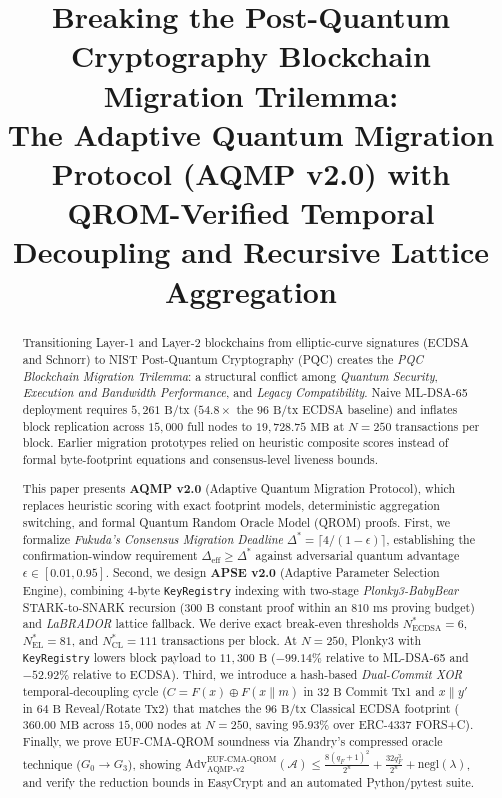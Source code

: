 \documentclass[conference,compsoc]{IEEEtran}
\title{Breaking the Post-Quantum Cryptography Blockchain Migration Trilemma:\\
The Adaptive Quantum Migration Protocol (AQMP v2.0) with QROM-Verified Temporal Decoupling and Recursive Lattice Aggregation}
\author{
  \IEEEauthorblockN{Laudza Kusuma}
  \IEEEauthorblockA{Independent Researcher, Depok, Indonesia\\
  Email: laudzaxie@gmail.com\\
  Web: \url{https://laudzakusuma.github.io}}
}
\begin{document}
\sloppy
\maketitle

\begin{abstract}
Transitioning Layer-1 and Layer-2 blockchains from elliptic-curve signatures (ECDSA and Schnorr) to NIST Post-Quantum Cryptography (PQC) creates the \emph{PQC Blockchain Migration Trilemma}: a structural conflict among \emph{Quantum Security}, \emph{Execution and Bandwidth Performance}, and \emph{Legacy Compatibility}. Naive ML-DSA-65 deployment requires $5{,}261\text{ B/tx}$ ($54.8\times$ the $96\text{ B/tx}$ ECDSA baseline) and inflates block replication across $15{,}000$ full nodes to $19{,}728.75\text{ MB}$ at $N = 250$ transactions per block. Earlier migration prototypes relied on heuristic composite scores instead of formal byte-footprint equations and consensus-level liveness bounds.

This paper presents \textbf{AQMP v2.0} (Adaptive Quantum Migration Protocol), which replaces heuristic scoring with exact footprint models, deterministic aggregation switching, and formal Quantum Random Oracle Model (QROM) proofs. First, we formalize \emph{Fukuda's Consensus Migration Deadline} $\Delta^* = \lceil 4/(1-\epsilon)\rceil$, establishing the confirmation-window requirement $\Delta_{\text{eff}} \ge \Delta^*$ against adversarial quantum advantage $\epsilon \in [0.01, 0.95]$. Second, we design \textbf{APSE v2.0} (Adaptive Parameter Selection Engine), combining 4-byte \texttt{KeyRegistry} indexing with two-stage \emph{Plonky3-BabyBear} STARK-to-SNARK recursion ($300\text{ B}$ constant proof within an $810\text{ ms}$ proving budget) and \emph{LaBRADOR} lattice fallback. We derive exact break-even thresholds $N^*_{\text{ECDSA}} = 6$, $N^*_{\text{EL}} = 81$, and $N^*_{\text{CL}} = 111$ transactions per block. At $N = 250$, Plonky3 with \texttt{KeyRegistry} lowers block payload to $11{,}300\text{ B}$ ($-99.14\%$ relative to ML-DSA-65 and $-52.92\%$ relative to ECDSA). Third, we introduce a hash-based \emph{Dual-Commit XOR} temporal-decoupling cycle ($C = F(x) \oplus F(x \parallel m)$ in $32\text{ B}$ Commit Tx1 and $x \parallel y'$ in $64\text{ B}$ Reveal/Rotate Tx2) that matches the $96\text{ B/tx}$ Classical ECDSA footprint ($360.00\text{ MB}$ across $15{,}000$ nodes at $N = 250$, saving $95.93\%$ over ERC-4337 FORS+C). Finally, we prove EUF-CMA-QROM soundness via Zhandry's compressed oracle technique ($G_0 \to G_3$), showing $\text{Adv}^{\text{EUF-CMA-QROM}}_{\text{AQMP-v2}}(\mathcal{A}) \le \frac{8(q_F+1)^2}{2^n} + \frac{32 q_F^3}{2^n} + \text{negl}(\lambda)$, and verify the reduction bounds in EasyCrypt and an automated Python/pytest suite.
\end{abstract}
\end{document}
